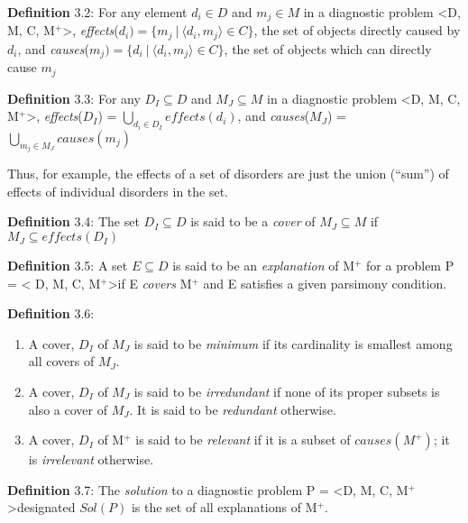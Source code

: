 \documentclass{article}
\begin{document}
\par 
\textbf{Definition} 3.2: For any element $d_i \in D$ and $m_j \in M$ in a
diagnostic problem \textless D, M, C, M$^{+}$\textgreater,
\textit{effects}($d_i) = \{ m_j\:|\:\langle d_i, m_j\rangle \in C\}$, the set
of objects directly caused by $d_i$, and 
\textit{causes}($m_j) = \{ d_i\:|\:\langle d_i, m_j\rangle \in C\}$, the set of
objects which can directly cause $m_j$
\newline

\par 
\textbf{Definition} 3.3: For any $D_I \subseteq D$ and $M_J \subseteq M$ in a
diagnostic problem \textless D, M, C, M$^{+}$\textgreater,
\textit{effects}($D_I$) = $\bigcup\limits_{d_i \in D_I} effects(d_i)$, and
\textit{causes}($M_J$) = $\bigcup\limits_{m_j \in M_J} causes(m_j)$
\newline
\par 
Thus, for example, the effects of a set of disorders are just the union
(``sum'') of effects of individual disorders in the set.
\newline

\par 
\textbf{Definition} 3.4: The set $D_I \subseteq D$ is said to be a
\textit{cover} of $M_J \subseteq M$ if $M_J \subseteq effects(D_I)$
\newline

\par 
\textbf{Definition} 3.5: A set $E \subseteq D$ is said to be an
\textit{explanation} of M$^{+}$ for a problem P = \textless
D, M, C, M$^{+}$\textgreater if E \textit{covers} M$^{+}$ and E satisfies a
given parsimony condition.
\newline

\par 
\textbf{Definition} 3.6: 
\begin{enumerate}
\item A cover, $D_I$ of $M_J$ is said to be \textit{minimum}
if its cardinality is smallest among all covers of $M_J$.
\item A cover, $D_I$ of $M_J$ is said to be \textit{irredundant} if none of its
proper subsets is also a cover of $M_J$. It is said to be \textit{redundant}
otherwise.
\item A cover, $D_I$ of M$^{+}$ is said to be \textit{relevant} if it is a
subset of $causes(M^{+})$; it is \textit{irrelevant} otherwise.
\end{enumerate}

\par 
\textbf{Definition} 3.7: The \textit{solution} to a diagnostic problem
P = \textless D, M, C, M$^{+}$\textgreater designated $Sol(P)$ is the set of all
explanations of M$^{+}$.
\newline
\end{document}
